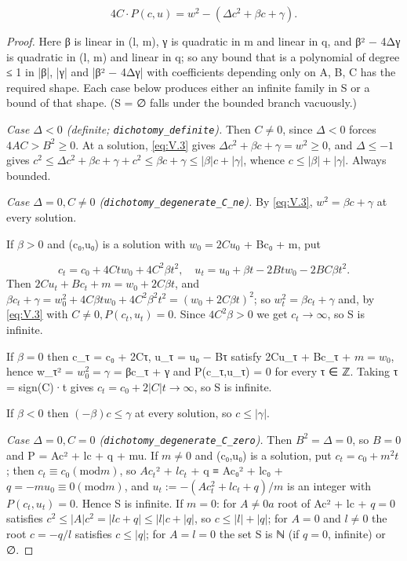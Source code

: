 \documentclass[11pt]{article}
\theoremstyle{plain}
\theoremstyle{definition}
\theoremstyle{remark}
\theoremstyle{plain}
\theoremstyle{definition}
\theoremstyle{remark}
\newcounter{Part}
\theoremstyle{plain}
\newtheorem{theoremPart}[Part]{Theorem}
\theoremstyle{definition}
\theoremstyle{remark}
\begin{document}
\begin{equation}\tag{V.3}\label{eq:V.3}
4C·P(c,u) = w^{2} − (Δc^{2} + βc + γ).
\end{equation}
\begin{proof}
Here β is linear in (l, m), γ is quadratic in m and linear in q, and β² − 4Δγ is quadratic in (l, m) and linear in q; so any bound that is a polynomial of degree ≤ 1 in |β|, |γ| and |β² − 4Δγ| with coefficients depending only on A, B, C has the required shape. Each case below produces either an infinite family in S or a bound of that shape. (S = ∅ falls under the bounded branch vacuously.)

\emph{Case $Δ < 0$ (definite; \texttt{dichotomy\_\allowbreak{}definite}).} Then $C ≠ 0$, since $Δ < 0$ forces $4AC > B^{2} ≥ 0$. At a solution, \eqref{eq:V.3} gives $Δc^{2} + βc + γ = w^{2} ≥ 0$, and $Δ ≤ −1$ gives $c^{2} ≤ Δc^{2} + βc + γ + c^{2} ≤ βc + γ ≤ |β|c + |γ|$, whence $c ≤ |β| + |γ|$. Always bounded.

\emph{Case $Δ = 0, C ≠ 0$ (\texttt{dichotomy\_\allowbreak{}degenerate\_\allowbreak{}C\_\allowbreak{}ne}).} By \eqref{eq:V.3}, $w^{2} = βc + γ$ at every solution.

If $β > 0$ and (c₀,u₀) is a solution with $w_{0} = 2Cu_{0}$ + Bc₀ + m, put

\[
c_{t} = c_{0} + 4Ctw_{0} + 4C^{2}βt^{2}, \quad u_{t} = u_{0} + βt − 2Btw_{0} − 2BCβt^{2}.
\]
Then $2Cu_{t} + Bc_{t} + m = w_{0} + 2Cβt$, and $βc_{t} + γ = w_{0}^{2} + 4Cβtw_{0} + 4C^{2}β^{2}t^{2} = (w_{0} + 2Cβt)^{2}$; so $w_{t}^{2} = βc_{t} + γ$ and, by \eqref{eq:V.3} with $C ≠ 0, P(c_{t},u_{t}) = 0$. Since $4C^{2}β > 0$ we get $c_{t} → ∞$, so S is infinite.

If $β = 0$ then c\_τ = c₀ + 2Cτ, u\_τ = u₀ − Bτ satisfy 2Cu\_τ + Bc\_τ + $m = w_{0}$, hence w\_τ² = $w_{0}^{2} = γ$ = βc\_τ + γ and P(c\_τ,u\_τ) = 0 for every τ ∈ ℤ. Taking τ = sign(C)·t gives $c_{t} = c_{0} + 2|C|t → ∞$, so S is infinite.

If $β < 0$ then $(−β)c ≤ γ$ at every solution, so $c ≤ |γ|$.

\emph{Case $Δ = 0, C = 0$ (\texttt{dichotomy\_\allowbreak{}degenerate\_\allowbreak{}C\_\allowbreak{}zero}).} Then $B^{2} = Δ = 0$, so $B = 0$ and P = Ac² + lc + q + mu. If $m ≠ 0$ and (c₀,u₀) is a solution, put $c_{t} = c_{0} + m^{2}t$; then $c_{t} ≡ c_{0} (\mathrm{mod} m)$, so $Ac_{t}$² + $lc_{t}$ + q ≡ Ac₀² + lc₀ + $q = −mu_{0} ≡ 0 (\mathrm{mod} m)$, and $u_{t} := −(Ac_{t}^{2} + lc_{t} + q)/m$ is an integer with $P(c_{t},u_{t}) = 0$. Hence S is infinite. If $m = 0$: for $A ≠ 0 a$ root of Ac² + lc + $q = 0$ satisfies $c^{2} ≤ |A|c^{2} = |lc + q| ≤ |l|c + |q|$, so $c ≤ |l| + |q|$; for $A = 0$ and $l ≠ 0$ the root $c = −q/l$ satisfies $c ≤ |q|$; for $A = l = 0$ the set S is ℕ (if $q = 0$, infinite) or ∅.


\end{proof}
\end{document}
